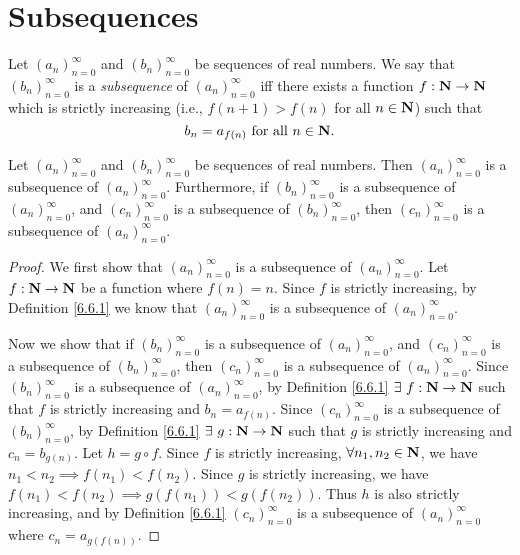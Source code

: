 \section{Subsequences}\label{sec 6.6}

\begin{definition}[Subsequences]\label{6.6.1}
    Let \((a_n)_{n = 0}^\infty\) and \((b_n)_{n = 0}^\infty\) be sequences of real numbers.
    We say that \((b_n)_{n = 0}^\infty\) is a \emph{subsequence} of \((a_n)_{n = 0}^\infty\) iff there exists a function \(f : \mathbf{N} \to \mathbf{N}\) which is strictly increasing (i.e., \(f(n + 1) > f(n)\) for all \(n \in \mathbf{N}\)) such that
    \[
        b_n = a_{f(n)} \text{ for all } n \in \mathbf{N}.
    \]
\end{definition}

\setcounter{theorem}{3}
\begin{lemma}\label{6.6.4}
    Let \((a_n)_{n = 0}^\infty\) and \((b_n)_{n = 0}^\infty\) be sequences of real numbers.
    Then \((a_n)_{n = 0}^\infty\) is a subsequence of \((a_n)_{n = 0}^\infty\).
    Furthermore, if \((b_n)_{n = 0}^\infty\) is a subsequence of \((a_n)_{n = 0}^\infty\), and \((c_n)_{n = 0}^\infty\) is a subsequence of \((b_n)_{n = 0}^\infty\), then \((c_n)_{n = 0}^\infty\) is a subsequence of \((a_n)_{n = 0}^\infty\).
\end{lemma}

\begin{proof}
    We first show that \((a_n)_{n = 0}^\infty\) is a subsequence of \((a_n)_{n = 0}^\infty\).
    Let \(f : \mathbf{N} \to \mathbf{N}\) be a function where \(f(n) = n\).
    Since \(f\) is strictly increasing, by Definition \ref{6.6.1} we know that \((a_n)_{n = 0}^\infty\) is a subsequence of \((a_n)_{n = 0}^\infty\).

    Now we show that if \((b_n)_{n = 0}^\infty\) is a subsequence of \((a_n)_{n = 0}^\infty\), and \((c_n)_{n = 0}^\infty\) is a subsequence of \((b_n)_{n = 0}^\infty\), then \((c_n)_{n = 0}^\infty\) is a subsequence of \((a_n)_{n = 0}^\infty\).
    Since \((b_n)_{n = 0}^\infty\) is a subsequence of \((a_n)_{n = 0}^\infty\), by Definition \ref{6.6.1} \(\exists\ f : \mathbf{N} \to \mathbf{N}\) such that \(f\) is strictly increasing and \(b_n = a_{f(n)}\).
    Since \((c_n)_{n = 0}^\infty\) is a subsequence of \((b_n)_{n = 0}^\infty\), by Definition \ref{6.6.1} \(\exists\ g : \mathbf{N} \to \mathbf{N}\) such that \(g\) is strictly increasing and \(c_n = b_{g(n)}\).
    Let \(h = g \circ f\).
    Since \(f\) is strictly increasing, \(\forall n_1, n_2 \in \mathbf{N}\), we have \(n_1 < n_2 \implies f(n_1) < f(n_2)\).
    Since \(g\) is strictly increasing, we have \(f(n_1) < f(n_2) \implies g(f(n_1)) < g(f(n_2))\).
    Thus \(h\) is also strictly increasing, and by Definition \ref{6.6.1} \((c_n)_{n = 0}^\infty\) is a subsequence of \((a_n)_{n = 0}^\infty\) where \(c_n = a_{g(f(n))}\).
\end{proof}


